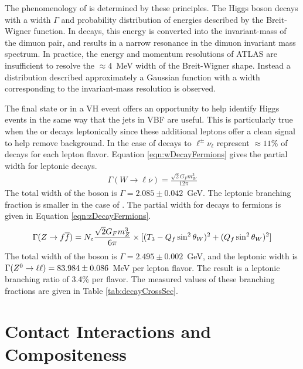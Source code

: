 The phenomenology of \hmm is determined by these principles.
The Higgs boson decays with a width $\Gamma$ and probability distribution of energies described by the Breit-Wigner function.
In \hmm decays, this energy is converted into the invariant-mass of the dimuon pair, and results in a narrow resonance in the dimuon invariant mass spectrum.
In practice, the energy and momentum resolutions of ATLAS are insufficient to resolve the $\approx4$~MeV width of the Breit-Wigner shape.
Instead a distribution described approximately a Gaussian function with a width corresponding to the invariant-mass resolution is observed.

The final state \W or \Z in a VH event offers an opportunity to help identify Higgs events in the same way that the jets in VBF are useful.
This is particularly true when the \W or \Z decays leptonically since these additional leptons offer a clean signal to help remove background.
In the case of \W decays to $\ell^\pm\nu_\ell$ represent $\approx11\%$ of decays for each lepton flavor.
Equation \ref{eqn:wDecayFermions} gives the partial width for leptonic \W decays.
\begin{equation}\begin{split}\label{eqn:wDecayFermions}
    \Gamma(W\to\ell\overline{\nu})=\frac{\sqrt{2}G_Fm_W^3}{12\pi}
\end{split}\end{equation} 
The total width of the \W boson is $\Gamma=2.085\pm0.042$~GeV.
The leptonic branching fraction is smaller in the case of \Z.
The partial width for \Z decays to fermions is given in Equation \ref{eqn:zDecayFermions}.
\begin{equation}\begin{split}\label{eqn:zDecayFermions}
    \Gamma(Z\to f\overline{f})=N_c\frac{\sqrt{2}G_Fm_Z^3}{6\pi}\times[(T_3-Q_f\sin^2\theta_W)^2+(Q_f\sin^2\theta_W)^2]
\end{split}\end{equation} 
The total width of the \Z boson is $\Gamma=2.495\pm0.002$~GeV, and the leptonic width is $\Gamma(Z^0\to\ell\ell)=83.984\pm0.086$~MeV per lepton flavor.
The result is a leptonic branching ratio of 3.4\% per flavor. \cite{pdg2018}
The measured values of these branching fractions are given in Table \ref{tab:decayCrossSec}.

\section{Contact Interactions and Compositeness}

